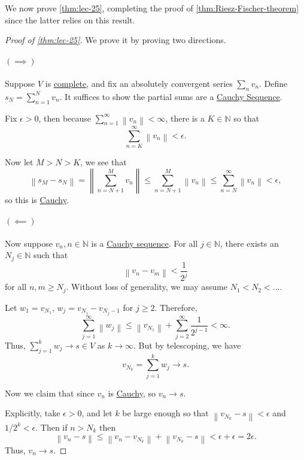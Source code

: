 We now prove \autoref{thm:lec-25}, completing the proof of \autoref{thm:Riesz-Fischer-theorem} since the latter relies on this result.

\begin{proof}[Proof of \autoref{thm:lec-25}]\label{pf:thm:lec25}
	We prove it by proving two directions.
	\paragraph{\((\implies)\)} Suppose \(V\) is \hyperref[def:complete]{complete}, and fix an absolutely convergent series \(\sum_n v_n\). Define \(s_N = \sum_{n=1}^N v_n\).
	It suffices to show the partial sums are a \hyperref[def:Cauchy-sequence]{Cauchy Sequence}.

	Fix \(\epsilon > 0\), then because \(\sum_{n=1}^\infty \left\lVert v_n\right\rVert  < \infty\), there is a \(K \in \mathbb{N}\) so that
	\[
		\sum_{n=K}^\infty \left\lVert v_n\right\rVert  < \epsilon.
	\]

	Now let \(M > N > K\), we see that
	\[
		\left\lVert s_M - s_N\right\rVert = \left\lVert \sum_{n = N + 1}^M v_n\right\rVert \leq \sum_{n=N+1}^M \left\lVert v_n\right\rVert  \leq \sum_{n=N}^\infty \left\lVert v_n\right\rVert  < \epsilon,
	\]
	so this is \hyperref[def:Cauchy-sequence]{Cauchy}.

	\paragraph{\((\impliedby)\)} Now suppose \(v_n, n \in \mathbb{N}\) is a \hyperref[def:Cauchy-sequence]{Cauchy sequence}. For all \(j \in \mathbb{N}\),
	there exists an \(N_j \in \mathbb{N}\) such that
	\[
		\left\lVert v_n - v_m\right\rVert  < \frac{1}{2^j}
	\]
	for all \(n, m \geq N_j\). Without loss of generality, we may assume \(N_1 < N_2 < \dots \).

	Let \(w_1 = v_{N_1}\), \(w_j = v_{N_j} - v_{N_j - 1}\) for \(j \geq 2\). Therefore,
	\[
		\sum_{j=1}^\infty \left\lVert w_j\right\rVert \leq \left\lVert v_{N_1}\right\rVert + \sum_{j=2}^\infty \frac{1}{2^{j-1}} < \infty.
	\]
	Thus, \(\sum_{j=1}^k w_j \to s \in V\) as \(k \to \infty\). But by telescoping, we have
	\[
		v_{N_k} = \sum_{j=1}^k w_j \to s.
	\]

	Now we claim that since \(v_n\) is \hyperref[def:Cauchy-sequence]{Cauchy}, so \(v_n \to s\).

	Explicitly, take \(\epsilon > 0\), and let \(k\) be large enough so that \(\left\lVert v_{N_k} - s\right\rVert < \epsilon\) and \(1/2^k < \epsilon\). Then if \(n > N_k\) then
	\[
		\left\lVert v_n - s\right\rVert \leq \left\lVert v_n - v_{N_k}\right\rVert + \left\lVert v_{N_k} - s\right\rVert < \epsilon + \epsilon = 2\epsilon.
	\]
	Thus, \(v_n \to s\).
\end{proof}

